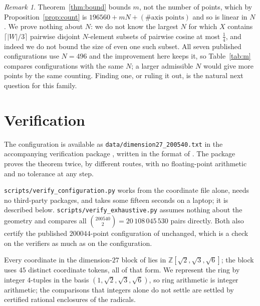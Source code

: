 \documentclass[11pt]{amsart}
\theoremstyle{remark}
\newtheorem{remark}[theorem]{Remark}
\begin{document}
\begin{remark}\label{rem:N}
Theorem~\ref{thm:bound} bounds $m$, not the number of points, which by
Proposition~\ref{prop:count} is $196560+mN+(\text{\# axis points})$ and so is
linear in $N$. We prove nothing about $N$: we do not know the largest $N$ for
which $X$ contains $\lceil|W|/3\rceil$ pairwise disjoint $N$-element subsets of
pairwise cosine at most $\tfrac14$, and indeed we do not bound the size of even
one such subset. All seven published configurations use $N=496$ and the
improvement here keeps it, so Table~\ref{tab:m} compares configurations with the
same $N$; a larger admissible $N$ would give more points by the same counting.
Finding one, or ruling it out, is the natural next question for this family.
\end{remark}

\section{Verification}\label{sec:verification}

The configuration is available as \texttt{data/dimension27\_200540.txt} in the
accompanying verification package \cite{repo}, written in the format of
\cite{cohn-data}. The package proves the theorem twice, by different routes,
with no floating-point arithmetic and no tolerance at any step.

\texttt{scripts/verify\_configuration.py} works from the coordinate file alone,
needs no third-party packages, and takes some fifteen seconds on a laptop; it is
described below. \texttt{scripts/verify\_exhaustive.py} assumes nothing about the
geometry and compares all $\binom{200540}{2}=20\,108\,045\,530$ pairs directly.
Both also certify the published $200044$-point configuration of \cite{ma2025}
unchanged, which is a check on the verifiers as much as on the configuration.

Every coordinate in the dimension-$27$ block of \cite{cohn-data} lies in
$\mathbb{Z}[\sqrt2,\sqrt3,\sqrt6]$; the block uses $45$ distinct coordinate
tokens, all of that form. We represent the ring by integer $4$-tuples in the
basis $(1,\sqrt2,\sqrt3,\sqrt6)$, so ring arithmetic is integer arithmetic; the
comparisons that integers alone do not settle are settled by certified rational
enclosures of the radicals.
\end{document}
